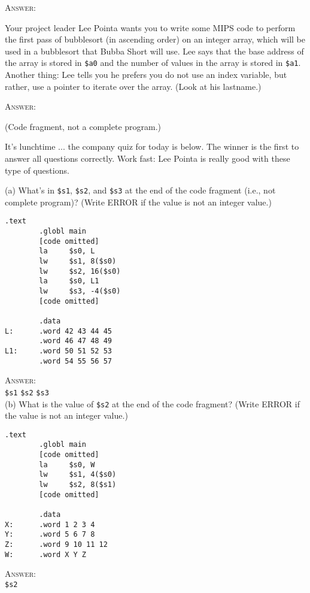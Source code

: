 \textsc{Answer:}
\begin{answercode}

\end{answercode}

\newpage
\nextq
Your project leader Lee Pointa
wants you to write some MIPS code to perform the first pass of bubblesort
(in ascending order)
on an
integer array,
which will be used in a bubblesort that Bubba Short will use.
Lee says that the base address of the array is stored in \verb!$a0!
and the number of values in the array is stored in \verb!$a1!.
Another thing: Lee tells you he prefers you do not use an index variable, but
rather, use a pointer to iterate over the array.
(Look at his lastname.)

\textsc{Answer:}
\begin{answercode}

\end{answercode}
\vspace{-4mm}
(Code fragment, not a complete program.)

\newpage
\nextq
It's lunchtime ... the company quiz for today is below.
The winner is the first to answer all questions correctly.
Work fast: Lee Pointa is really good with these type of questions.

(a) What's in \verb!$s1!, \verb!$s2!, and \verb!$s3!
at the end of the code fragment (i.e., not complete program)?
(Write ERROR if the value is not an integer value.)
\begin{Verbatim}[frame=single,fontsize=\small]
        .text
        .globl main        
        [code omitted]
        la     $s0, L
        lw     $s1, 8($s0)
        lw     $s2, 16($s0)
        la     $s0, L1
        lw     $s3, -4($s0)
        [code omitted]
        
        .data
L:      .word 42 43 44 45
        .word 46 47 48 49
L1:     .word 50 51 52 53
        .word 54 55 56 57
\end{Verbatim}
\textsc{Answer:}
\\
\verb!$s1!  \hspace{1cm}
\verb!$s2!  \hspace{1cm}
\verb!$s3!  \\

(b)
What is the value of \verb!$s2! at the end of the code fragment?
(Write ERROR if the value is not an integer value.)
\begin{Verbatim}[frame=single,fontsize=\small]
        .text
        .globl main        
        [code omitted]
        la     $s0, W
        lw     $s1, 4($s0)
        lw     $s2, 8($s1)
        [code omitted]
        
        .data
X:      .word 1 2 3 4
Y:      .word 5 6 7 8
Z:      .word 9 10 11 12
W:      .word X Y Z
\end{Verbatim}
\textsc{Answer:} \\
\verb!$s2! 

